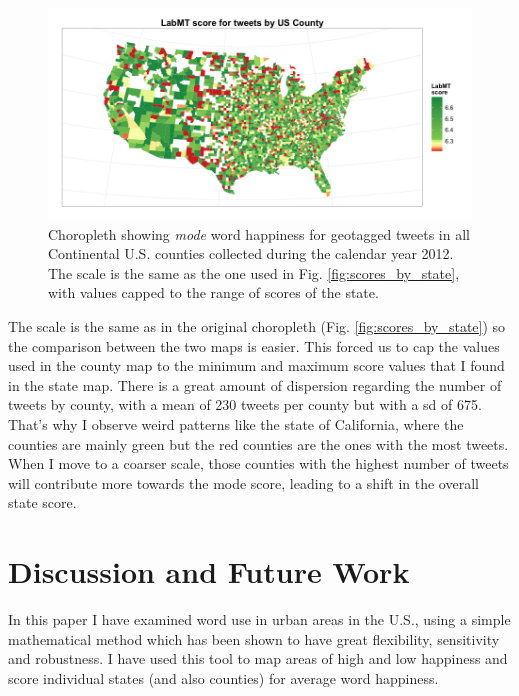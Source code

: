 \documentclass{llncs}
\begin{document}
\begin{figure}[!ht]
\centering
\includegraphics[width=\textwidth]{images/scores_by_county}
\caption{Choropleth showing \emph{mode} word happiness for geotagged tweets in all Continental U.S. counties collected during the calendar year 2012. The scale is the same as the one used in Fig. \ref{fig:scores_by_state}, with values capped to the range of scores of the state.}
\label{fig:scores_by_county}
\end{figure}

The scale is the same as in the original choropleth (Fig. \ref{fig:scores_by_state}) so the comparison between the two maps is easier. This forced us to cap the values used in the county map to the minimum and maximum score values that I found in the state map. There is a great amount of dispersion regarding the number of tweets by county, with a mean of 230 tweets per county but with a sd of 675. That's why I observe weird patterns like the state of California, where the counties are mainly green but the red counties are the ones with the most tweets. When I move to a coarser scale, those counties with the highest number of tweets will contribute more towards the mode score, leading to a shift in the overall state score.


\section{Discussion and Future Work}
\label{sec:conc}

In this paper I have examined word use in urban areas in the U.S., using a simple mathematical method which has been shown to have great flexibility, sensitivity and robustness. I have used this tool to map areas of high and low happiness and score individual states (and also counties) for average word happiness.
\end{document}
